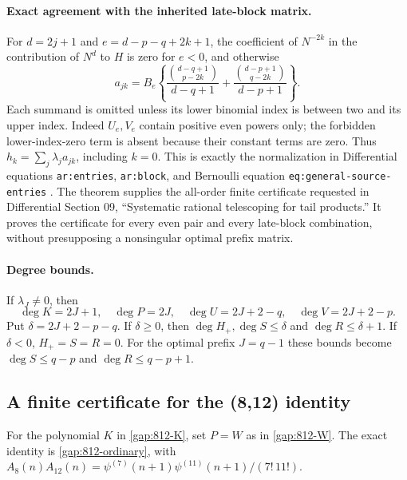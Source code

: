 \documentclass[11pt,letterpaper]{article}
\numberwithin{equation}{section}
\theoremstyle{plain}
\theoremstyle{definition}
\theoremstyle{remark}
\begin{document}
\paragraph{Exact agreement with the inherited late-block matrix.}
For $d=2j+1$ and $e=d-p-q+2k+1$, the coefficient of $N^{-2k}$ in
the contribution of $N^d$ to $H$ is zero for $e<0$, and otherwise
\[
 a_{jk}=B_e\left\{
 \frac{\binom{d-q+1}{p-2k}}{d-q+1}
 +\frac{\binom{d-p+1}{q-2k}}{d-p+1}\right\}.
\]
Each summand is omitted unless its lower binomial index is between
two and its upper index. Indeed $U_e,V_e$ contain positive even powers
only; the forbidden lower-index-zero term is absent because their
constant terms are zero. Thus $h_k=\sum_j\lambda_j a_{jk}$,
including $k=0$. This is exactly the normalization in
Differential equations \texttt{ar:entries}, \texttt{ar:block}, and
Bernoulli equation \texttt{eq:general-source-entries} \cite{DPL,BTD}.
The theorem supplies the all-order finite certificate requested in
Differential Section 09, ``Systematic rational telescoping for tail
products.'' It proves the certificate for every even pair and every
late-block combination, without presupposing a nonsingular optimal
prefix matrix.

\paragraph{Degree bounds.}
If $\lambda_J\ne0$, then
\[
 \deg K=2J+1,\quad\deg P=2J,\quad
 \deg U=2J+2-q,\quad\deg V=2J+2-p.
\]
Put $\delta=2J+2-p-q$. If $\delta\ge0$, then
$\deg H_+,\deg S\le\delta$ and $\deg R\le\delta+1$.
If $\delta<0$, $H_+=S=R=0$.
For the optimal prefix $J=q-1$ these bounds become
$\deg S\le q-p$ and $\deg R\le q-p+1$.

\subsection{A finite certificate for the (8,12) identity}
\label{tel:812}
For the polynomial $K$ in \eqref{gap:812-K}, set $P=W$ as in
\eqref{gap:812-W}. The exact identity is
\eqref{gap:812-ordinary}, with
$A_8(n)A_{12}(n)=\psi^{(7)}(n+1)\psi^{(11)}(n+1)/(7!\,11!)$.
\end{document}
